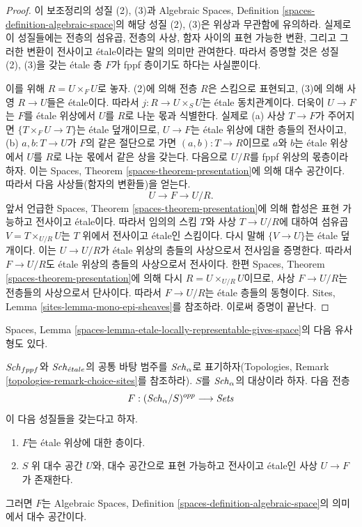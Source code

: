 \begin{proof}
이 보조정리의 성질 (2), (3)과 Algebraic Spaces, Definition
\ref{spaces-definition-algebraic-space}의 해당 성질 (2), (3)은
위상과 무관함에 유의하라. 실제로 이 성질들에는 전층의 섬유곱,
전층의 사상, 함자 사이의 표현 가능한 변환, 그리고 그러한 변환이
전사이고 \'etale이라는 말의 의미만 관여한다.
따라서 증명할 것은 성질 (2), (3)을 갖는 \'etale 층 $F$가
fppf 층이기도 하다는 사실뿐이다.

\medskip\noindent
이를 위해 $R = U \times_F U$로 놓자. (2)에 의해 전층 $R$은
스킴으로 표현되고, (3)에 의해 사영 $R \to U$들은 \'etale이다.
따라서 $j : R \to U \times_S U$는 \'etale 동치관계이다.
더욱이 $U \to F$는 $F$를 \'etale 위상에서 $U$를 $R$로 나눈
몫과 식별한다. 실제로 (a) 사상 $T \to F$가 주어지면
$\{T \times_F U \to T\}$는 \'etale 덮개이므로,
$U \to F$는 \'etale 위상에 대한 층들의 전사이고,
(b) $a, b : T \to U$가 $F$의 같은 절단으로 가면
$(a, b) : T \to R$이므로 $a$와 $b$는 \'etale 위상에서
$U$를 $R$로 나눈 몫에서 같은 상을 갖는다.
다음으로 $U/R$를 fppf 위상의 몫층이라 하자. 이는
Spaces, Theorem \ref{spaces-theorem-presentation}에 의해 대수 공간이다.
따라서 다음 사상들(함자의 변환들)을 얻는다.
$$
U \to F \to U/R.
$$
앞서 언급한 Spaces, Theorem
\ref{spaces-theorem-presentation}에 의해 합성은 표현 가능하고
전사이고 \'etale이다. 따라서 임의의 스킴 $T$와 사상
$T \to U/R$에 대하여 섬유곱 $V = T \times_{U/R} U$는
$T$ 위에서 전사이고 \'etale인 스킴이다. 다시 말해
$\{V \to U\}$는 \'etale 덮개이다. 이는 $U \to U/R$가
\'etale 위상의 층들의 사상으로서 전사임을 증명한다.
따라서 $F \to U/R$도 \'etale 위상의 층들의 사상으로서 전사이다.
한편 Spaces, Theorem \ref{spaces-theorem-presentation}에 의해 다시
$R = U \times_{U/R} U$이므로, 사상 $F \to U/R$는
전층들의 사상으로서 단사이다.
따라서 $F \to U/R$는 \'etale 층들의 동형이다.
Sites, Lemma \ref{sites-lemma-mono-epi-sheaves}를 참조하라.
이로써 증명이 끝난다.
\end{proof}

\noindent
Spaces, Lemma
\ref{spaces-lemma-etale-locally-representable-gives-space}의
다음 유사형도 있다.

\begin{lemma}
\label{lemma-spaces-etale-locally-representable}
$\mathit{Sch}_{fppf}$와 $\mathit{Sch}_{\acute{e}tale}$의 공통 바탕 범주를
$\mathit{Sch}_\alpha$로 표기하자(Topologies, Remark
\ref{topologies-remark-choice-sites}를 참조하라).
$S$를 $\mathit{Sch}_\alpha$의 대상이라 하자. 다음 전층
$$
F : (\mathit{Sch}_\alpha/S)^{opp} \longrightarrow \textit{Sets}
$$
이 다음 성질들을 갖는다고 하자.
\begin{enumerate}
\item $F$는 \'etale 위상에 대한 층이다.
\item $S$ 위 대수 공간 $U$와, 대수 공간으로 표현 가능하고
전사이고 \'etale인 사상 $U \to F$가 존재한다.
\end{enumerate}
그러면 $F$는 Algebraic Spaces, Definition
\ref{spaces-definition-algebraic-space}의 의미에서 대수 공간이다.
\end{lemma}

